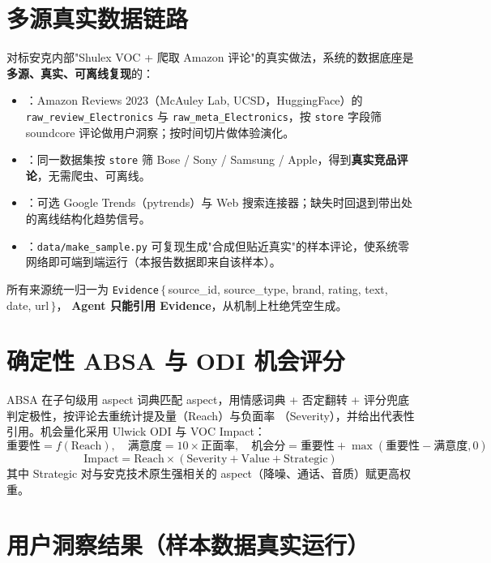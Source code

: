 \section{多源真实数据链路}

对标安克内部"Shulex VOC + 爬取 Amazon 评论"的真实做法，系统的数据底座是\textbf{多源、真实、可离线复现}的：

\begin{itemize}
\item {}：Amazon Reviews 2023（McAuley Lab, UCSD，HuggingFace）的 \texttt{raw\_review\_Electronics}
  与 \texttt{raw\_meta\_Electronics}，按 \texttt{store} 字段筛 soundcore 评论做用户洞察；按时间切片做体验演化。
\item {}：同一数据集按 \texttt{store} 筛 Bose / Sony / Samsung / Apple，得到\textbf{真实竞品评论}，无需爬虫、可离线。
\item {}：可选 Google Trends（pytrends）与 Web 搜索连接器；缺失时回退到带出处的离线结构化趋势信号。
\item {}：\texttt{data/make\_sample.py} 可复现生成"合成但贴近真实"的样本评论，使系统零网络即可端到端运行（本报告数据即来自该样本）。
\end{itemize}

所有来源统一归一为 \texttt{Evidence}\,$\{$\,source\_id, source\_type, brand, rating, text, date, url\,$\}$，
\textbf{Agent 只能引用 Evidence}，从机制上杜绝凭空生成。

\section{确定性 ABSA 与 ODI 机会评分}

ABSA 在子句级用 aspect 词典匹配 aspect，用情感词典 + 否定翻转 + 评分兜底判定极性，按评论去重统计提及量（Reach）与负面率
（Severity），并给出代表性引用。机会量化采用 Ulwick ODI 与 VOC Impact：
\[
\text{重要性}=f(\text{Reach}),\quad \text{满意度}=10\times\text{正面率},\quad
\text{机会分}=\text{重要性}+\max(\text{重要性}-\text{满意度},0)
\]
\[
\text{Impact}=\text{Reach}\times(\text{Severity}+\text{Value}+\text{Strategic})
\]
其中 Strategic 对与安克技术原生强相关的 aspect（降噪、通话、音质）赋更高权重。

\section{用户洞察结果（样本数据真实运行）}

